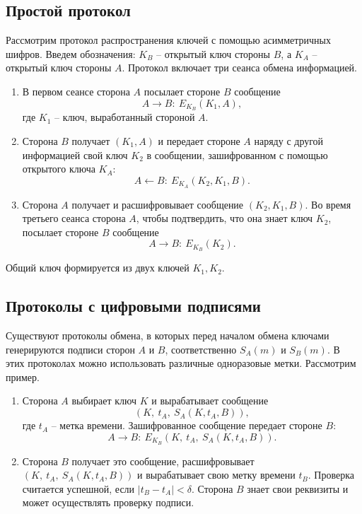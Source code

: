 \documentclass[10pt,a4paper]{book}
\begin{document}
\subsection{Простой протокол}

Рассмотрим протокол распространения ключей с помощью асимметричных шифров. Введем обозначения: $K_B$ -- открытый ключ стороны $B$, а $K_A$ -- открытый ключ стороны $A$. Протокол включает три сеанса обмена информацией.
\begin{enumerate}
    \item В первом сеансе сторона $A$ посылает стороне $B$ сообщение
            \[ A \rightarrow B: ~ E_{K_B}(K_1, A), \]
        где $K_1$ -- ключ, выработанный стороной $A$.
    \item Сторона $B$ получает $(K_1, A)$ и передает стороне $A$ наряду с другой информацией свой ключ $K_2$ в сообщении, зашифрованном с помощью открытого ключа $K_A$:
            \[ A \leftarrow B: ~ E_{K_A}(K_2, K_1, B). \]
    \item Сторона $A$ получает и расшифровывает сообщение $(K_2, K_1, B)$. Во время третьего сеанса сторона $A$, чтобы подтвердить, что она знает ключ $K_2$, посылает стороне $B$ сообщение
            \[ A \rightarrow B: ~ E_{K_B}(K_2). \]
\end{enumerate}
Общий ключ формируется из двух ключей $K_1, K_2$.

\subsection{Протоколы с цифровыми подписями}

Существуют протоколы обмена, в которых перед началом обмена ключами генерируются подписи сторон $A$ и $B$, соответственно $S_A(m)$ и $S_B(m)$. В этих протоколах можно использовать различные одноразовые метки. Рассмотрим пример.
\begin{enumerate}
    \item Сторона $A$ выбирает ключ $K$ и вырабатывает сообщение
            \[ \left( K, ~ t_A, ~ S_A(K, t_A, B) \right), \]
        где $t_A$ -- метка времени. Зашифрованное сообщение передает стороне $B$:
        \[ A \rightarrow B: ~ E_{K_B}(K, ~ t_A, ~ S_A(K, t_A, B)). \]
    \item Сторона $B$ получает это сообщение, расшифровывает $\left( K, ~ t_A, ~ S_A(K, t_A, B) \right)$ и вырабатывает свою метку времени $t_B$. Проверка считается успешной, если $|t_B - t_A | < \delta $. Сторона $B$ знает свои реквизиты и может осуществлять проверку подписи.
\end{enumerate}
\end{document}
